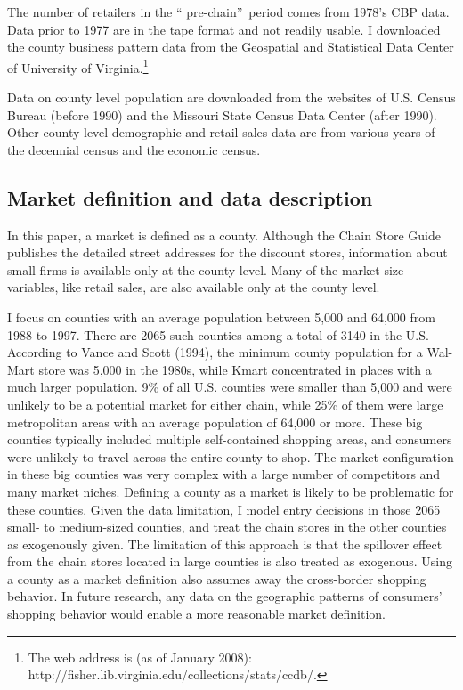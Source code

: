 \documentclass[notitlepage,onecolumn,11pt]{article}
\begin{document}
The number of retailers in the \textquotedblleft
pre-chain\textquotedblright\ period comes from 1978's CBP data. Data prior
to 1977 are in the tape format and not readily usable. I downloaded the
county business pattern data from the Geospatial and Statistical Data Center
of University of Virginia.\footnote{%
The web address is (as of January 2008):
http://fisher.lib.virginia.edu/collections/stats/ccdb/.}

Data on county level population are downloaded from the websites of U.S.
Census Bureau (before 1990) and the Missouri State Census Data Center (after
1990). Other county level demographic and retail sales data are from various
years of the decennial census and the economic census.

\subsection{Market definition and data description\label{Market}}

In this paper, a market is defined as a county. Although the Chain Store
Guide publishes the detailed street addresses for the discount stores,
information about small firms is available only at the county level. Many of
the market size variables, like retail sales, are also available only at the
county level.

I focus on counties with an average population between 5,000 and 64,000 from
1988 to 1997. There are 2065 such counties among a total of 3140 in the U.S.
According to Vance and Scott (1994), the minimum county population for a
Wal-Mart store was 5,000 in the 1980s, while Kmart concentrated in places
with a much larger population. 9\% of all U.S. counties were smaller than
5,000 and were unlikely to be a potential market for either chain, while
25\% of them were large metropolitan areas with an average population of
64,000 or more. These big counties typically included multiple
self-contained shopping areas, and consumers were unlikely to travel across
the entire county to shop. The market configuration in these big counties
was very complex with a large number of competitors and many market niches.
Defining a county as a market is likely to be problematic for these
counties. Given the data limitation, I model entry decisions in those 2065
small- to medium-sized counties, and treat the chain stores in the other
counties as exogenously given. The limitation of this approach is that the
spillover effect from the chain stores located in large counties is also
treated as exogenous. Using a county as a market definition also assumes
away the cross-border shopping behavior. In future research, any data on the
geographic patterns of consumers' shopping behavior would enable a more
reasonable market definition.
\end{document}
